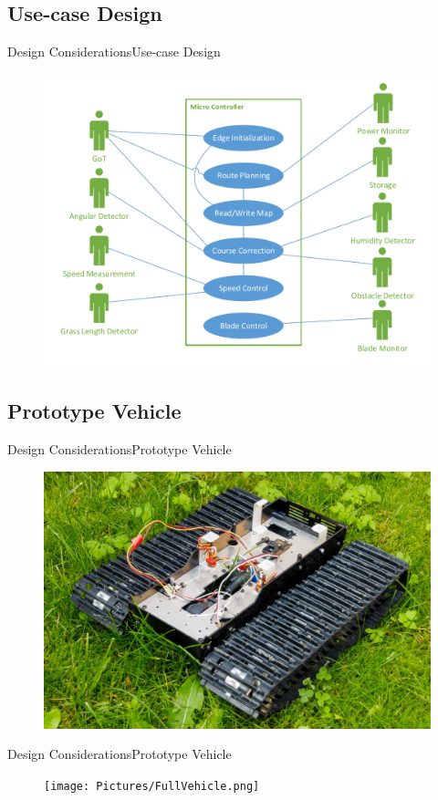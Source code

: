 \subsection{Use-case Design}

\begin{frame}{Design Considerations}{Use-case Design}
\begin{figure}
\centering
\includegraphics[width=\linewidth]{Pictures/P5UseCase.pdf}
\end{figure}
\end{frame}

\subsection{Prototype Vehicle}

\begin{frame}{Design Considerations}{Prototype Vehicle}
\begin{figure}
\includegraphics[width=\textwidth]{Pictures/BeltVehicle.jpg}
\end{figure}
\end{frame}
\begin{frame}{Design Considerations}{Prototype Vehicle}
\begin{figure}
\texttt{[image: Pictures/FullVehicle.png]}
\end{figure}
\end{frame}


